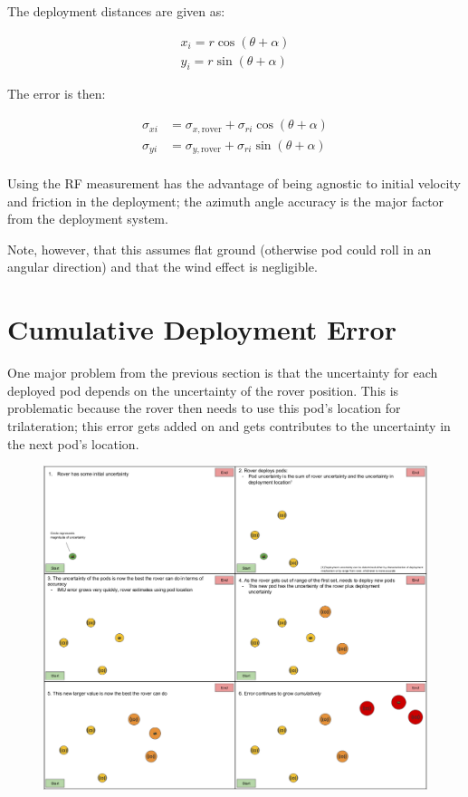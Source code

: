\documentclass[10pt,letterpaper]{article}
\begin{document}
The deployment distances are given as:

\begin{align*}
    x_i = r \cos(\theta + \alpha) \\
    y_i = r \sin(\theta + \alpha)
\end{align*}

The error is then:

\begin{align*}
    \sigma_{xi} &= \sigma_{x, \text{rover}} + \sigma_{ri} \cos \left( \theta + \alpha \right) \\
    \sigma_{yi} &= \sigma_{y, \text{rover}} + \sigma_{ri} \sin \left( \theta + \alpha \right) \\
\end{align*}

Using the RF measurement has the advantage of being agnostic to initial velocity and friction in the deployment; the azimuth angle accuracy is the major factor from the deployment system. 

Note, however, that this assumes flat ground (otherwise pod could roll in an angular direction) and that the wind effect is negligible. 





\newpage
\section{Cumulative Deployment Error}

One major problem from the previous section is that the uncertainty for each deployed pod depends on the uncertainty of the rover position. This is problematic because the rover then needs to use this pod's location for trilateration; this error gets added on and gets contributes to the uncertainty in the next pod's location. 


\begin{figure}[H]
\centering
\includegraphics[width=\textwidth]{error_diagram.png}
\end{figure}
\end{document}
